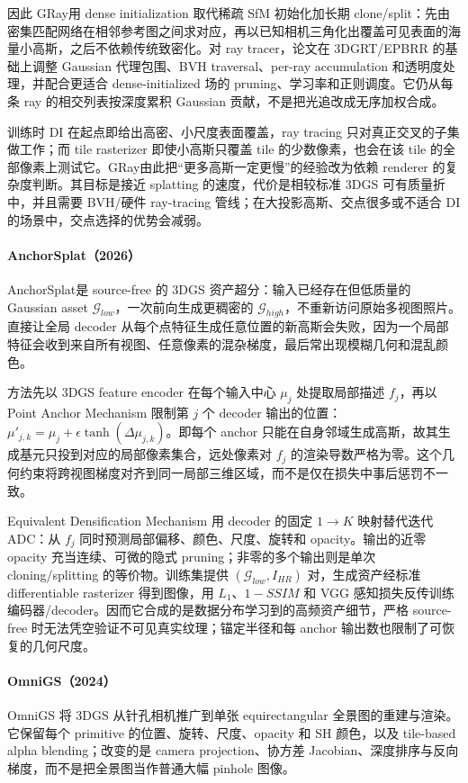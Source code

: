 因此 GRay用 dense initialization 取代稀疏 SfM 初始化加长期 clone/split：先由密集匹配网络在相邻参考图之间求对应，再以已知相机三角化出覆盖可见表面的海量小高斯，之后不依赖传统致密化。对 ray tracer，论文在 3DGRT/EPBRR 的基础上调整 Gaussian 代理包围、BVH traversal、per-ray accumulation 和透明度处理，并配合更适合 dense-initialized 场的 pruning、学习率和正则调度。它仍从每条 ray 的相交列表按深度累积 Gaussian 贡献，不是把光追改成无序加权合成。

训练时 DI 在起点即给出高密、小尺度表面覆盖，ray tracing 只对真正交叉的子集做工作；而 tile rasterizer 即使小高斯只覆盖 tile 的少数像素，也会在该 tile 的全部像素上测试它。GRay由此把“更多高斯一定更慢”的经验改为依赖 renderer 的复杂度判断。其目标是接近 splatting 的速度，代价是相较标准 3DGS 可有质量折中，并且需要 BVH/硬件 ray-tracing 管线；在大投影高斯、交点很多或不适合 DI 的场景中，交点选择的优势会减弱。

\paragraph{AnchorSplat（2026）\cite{2607_01290}}
AnchorSplat是 source-free 的 3DGS 资产超分：输入已经存在但低质量的 Gaussian asset $\mathcal G_{low}$，一次前向生成更稠密的 $\mathcal G_{high}$，不重新访问原始多视图照片。直接让全局 decoder 从每个点特征生成任意位置的新高斯会失败，因为一个局部特征会收到来自所有视图、任意像素的混杂梯度，最后常出现模糊几何和混乱颜色。

方法先以 3DGS feature encoder 在每个输入中心 $\mu_j$ 处提取局部描述 $f_j$，再以 Point Anchor Mechanism 限制第 $j$ 个 decoder 输出的位置：$\mu'_{j,k}=\mu_j+\epsilon\tanh(\Delta\mu_{j,k})$。即每个 anchor 只能在自身邻域生成高斯，故其生成基元只投到对应的局部像素集合，远处像素对 $f_j$ 的渲染导数严格为零。这个几何约束将跨视图梯度对齐到同一局部三维区域，而不是仅在损失中事后惩罚不一致。

Equivalent Densification Mechanism 用 decoder 的固定 $1\!\to\!K$ 映射替代迭代 ADC：从 $f_j$ 同时预测局部偏移、颜色、尺度、旋转和 opacity。输出的近零 opacity 充当连续、可微的隐式 pruning；非零的多个输出则是单次 cloning/splitting 的等价物。训练集提供 $(\mathcal G_{low},I_{HR})$ 对，生成资产经标准 differentiable rasterizer 得到图像，用 $L_1$、$1-SSIM$ 和 VGG 感知损失反传训练编码器/decoder。因而它合成的是数据分布学习到的高频资产细节，严格 source-free 时无法凭空验证不可见真实纹理；锚定半径和每 anchor 输出数也限制了可恢复的几何尺度。

\paragraph{OmniGS（2024）\cite{2404_03202}}
OmniGS 将 3DGS 从针孔相机推广到单张 equirectangular 全景图的重建与渲染。它保留每个 primitive 的位置、旋转、尺度、opacity 和 SH 颜色，以及 tile-based alpha blending；改变的是 camera projection、协方差 Jacobian、深度排序与反向梯度，而不是把全景图当作普通大幅 pinhole 图像。

